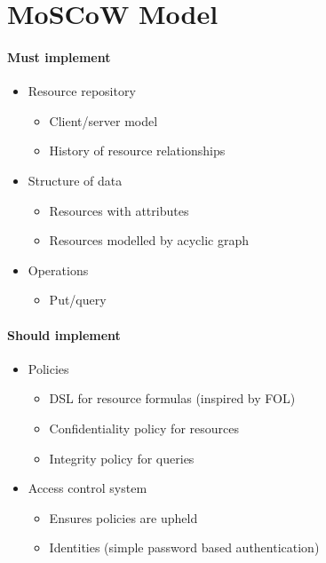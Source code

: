 
\section{MoSCoW Model}
\paragraph{Must implement}
\begin{itemize}
    \item Resource repository
    \begin{itemize}
        \item Client/server model
        \item History of resource relationships
    \end{itemize}
    \item Structure of data
    \begin{itemize}
        \item Resources with attributes
        \item Resources modelled by acyclic graph
    \end{itemize}
    \item Operations
    \begin{itemize}
        \item Put/query
    \end{itemize}
\end{itemize}

\paragraph{Should implement}
\begin{itemize}
    \item Policies
    \begin{itemize}
        \item DSL for resource formulas (inspired by FOL)
        \item Confidentiality policy for resources
        \item Integrity policy for queries
    \end{itemize}
    \item Access control system
    \begin{itemize}
        \item Ensures policies are upheld
        \item Identities (simple password based authentication)
    \end{itemize}
\end{itemize}


